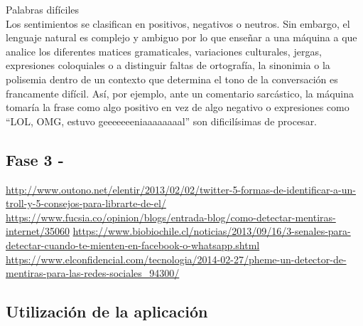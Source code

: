 \documentclass[../all.tex]{subfiles}
\begin{document}
    Palabras difíciles\\
    
    Los sentimientos se clasifican en positivos, negativos o neutros. Sin embargo, el lenguaje natural es complejo y ambiguo por lo que enseñar a una máquina a que analice los diferentes matices gramaticales, variaciones culturales, jergas, expresiones coloquiales o a distinguir faltas de ortografía, la sinonimia o la polisemia dentro de un contexto que determina el tono de la conversación es francamente difícil. Así, por ejemplo, ante un comentario sarcástico, la máquina tomaría la frase como algo positivo en vez de algo negativo o expresiones como “LOL, OMG, estuvo geeeeeeeniaaaaaaaal” son dificilísimas de procesar.

\newpage
\subsection{Fase 3 -}

\url{http://www.outono.net/elentir/2013/02/02/twitter-5-formas-de-identificar-a-un-troll-y-5-consejos-para-librarte-de-el/}
\url{https://www.fucsia.co/opinion/blogs/entrada-blog/como-detectar-mentiras-internet/35060}
\url{https://www.biobiochile.cl/noticias/2013/09/16/3-senales-para-detectar-cuando-te-mienten-en-facebook-o-whatsapp.shtml}
\url{https://www.elconfidencial.com/tecnologia/2014-02-27/pheme-un-detector-de-mentiras-para-las-redes-sociales_94300/}

\newpage
\subsection{Utilización de la aplicación}
\end{document}
